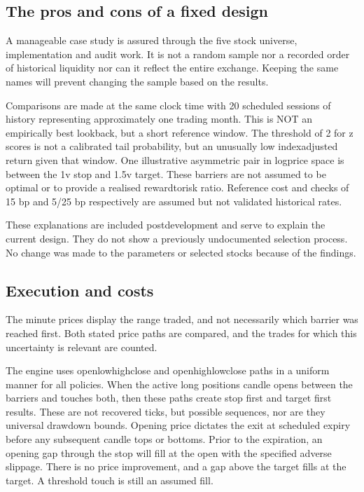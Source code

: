 \documentclass[11pt,a4paper]{article}
\begin{document}
\subsection*{The pros and cons of a fixed design}

A manageable case study is assured through the five stock universe, implementation and audit work. It is not a random sample nor a recorded order of historical liquidity nor can it reflect the entire exchange. Keeping the same names will prevent changing the sample based on the results.

Comparisons are made at the same clock time with 20 scheduled sessions of history representing approximately one trading month. This is NOT an empirically best lookback, but a short reference window. The threshold of \allowbreak{}2 for z scores is not a calibrated tail probability, but an unusually low index\allowbreak{}adjusted return given that window. One illustrative asymmetric pair in log\allowbreak{}price space is between the 1v stop and 1.5v target. These barriers are not assumed to be optimal or to provide a realised reward\allowbreak{}to\allowbreak{}risk ratio. Reference cost and checks of 15 bp and 5/25 bp respectively are assumed but not validated historical rates.

These explanations are included post\allowbreak{}development and serve to explain the current design. They do not show a previously undocumented selection process. No change was made to the parameters or selected stocks because of the findings.

\subsection*{Execution and costs}

The minute prices display the range traded, and not necessarily which barrier was reached first. Both stated price paths are compared, and the trades for which this uncertainty is relevant are counted.

The engine uses open\allowbreak{}low\allowbreak{}high\allowbreak{}close and open\allowbreak{}high\allowbreak{}low\allowbreak{}close paths in a uniform manner for all policies. When the active long positions candle opens between the barriers and touches both, then these paths create stop first and target first results. These are not recovered ticks, but possible sequences, nor are they universal drawdown bounds. Opening price dictates the exit at scheduled expiry before any subsequent candle tops or bottoms. Prior to the expiration, an opening gap through the stop will fill at the open with the specified adverse slippage. There is no price improvement, and a gap above the target fills at the target. A threshold touch is still an assumed fill.
\end{document}
